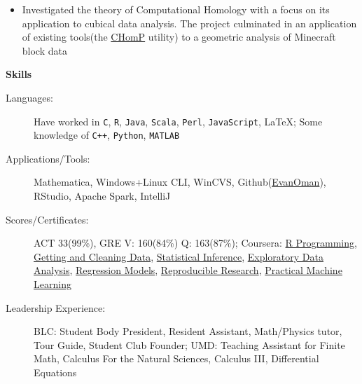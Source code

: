 \documentclass[letterpaper,10pt]{article}
\newcommand{\resitem}[1]{\item #1 

\vspace{-.1in}
}
\newcommand{\resheading}[1]{
	{
		\large\colorbox{mygrey}
		{
			\begin{minipage}{.98\textwidth}

			\centerline{\textbf{#1 \vphantom{p\^{E}}}}
			\end{minipage}
		}
	}
}
\begin{document}
			\vspace{-.1in}
			\begin{itemize}
				\vspace{-.15in}
				\resitem{Investigated the theory of Computational Homology with a focus on its application to cubical data analysis. The project culminated in an application of existing tools(the \href{http://chomp.rutgers.edu/}{CHomP} utility) to a geometric analysis of Minecraft block data}
			\end{itemize}
			\vspace{.1in}
	\resheading{Skills}
		\vspace{-.1in}
		\begin{description}
			\item[Languages:]
			Have worked in \verb!C!, \verb!R!, \verb!Java!, \verb!Scala!, \verb!Perl!, \verb!JavaScript!, \LaTeX; Some knowledge of \verb!C++!, \verb!Python!, \verb!MATLAB!
			\item[Applications/Tools:]
			Mathematica, Windows+Linux CLI, WinCVS, Github(\href{https://www.github.com/EvanOman}{EvanOman}), RStudio, Apache Spark, IntelliJ

			\item[Scores/Certificates:]
			ACT 33(99\%), GRE V: 160(84\%) Q: 163(87\%); Coursera: \href{https://www.coursera.org/account/accomplishments/records/cxq3vN5HB76be56t}{R Programming}, \href{https://www.coursera.org/account/accomplishments/records/Xt3sCA24Qz3Par7M}{Getting and Cleaning Data}, \href{https://www.coursera.org/account/accomplishments/records/yPex7nURcXCYdsse}{Statistical Inference}, \href{https://www.coursera.org/account/accomplishments/records/XMkgJcmHPGtNBXsU}{Exploratory Data Analysis}, \href{https://www.coursera.org/account/accomplishments/records/Qx8qaDCvw9ZNQtqP}{Regression Models}, \href{https://www.coursera.org/account/accomplishments/records/g5LfcvAD5rJuEnGX}{Reproducible Research},
			\href{https://www.coursera.org/account/accomplishments/verify/ZNTJVMJKSH}{Practical Machine Learning}

			\item[Leadership Experience:]
			BLC: Student Body President, Resident Assistant, Math/Physics tutor, Tour Guide, Student Club Founder; UMD: Teaching Assistant for Finite Math, Calculus For the Natural Sciences, Calculus III, Differential Equations
		\end{description}
\end{document}
